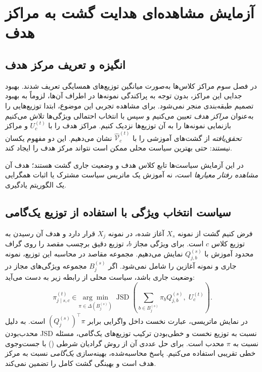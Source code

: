 \section{آزمایش مشاهده‌ای هدایت گشت به مراکز هدف}
\label{sec:ch4-center-target-observation}

\subsection{انگیزه و تعریف مرکز هدف}
\label{subsec:ch4-center-observation-motivation}
در فصل سوم مراکز کلاس‌ها به‌صورت میانگین توزیع‌های همسایگی تعریف شدند. بهبود جدایی این مراکز، بدون توجه به پراکندگی نمونه‌ها در اطراف آن‌ها، لزوماً به بهبود تصمیم طبقه‌بندی منجر نمی‌شود. برای مشاهده تجربی این موضوع، ابتدا توزیع‌هایی را به‌عنوان \emph{مراکز هدف} تعیین می‌کنیم و سپس با انتخاب احتمالی ویژگی‌ها تلاش می‌کنیم بازنمایی نمونه‌ها را به آن توزیع‌ها نزدیک کنیم. مراکز هدف را با $U_c^{(t)}$ و مراکز \emph{تحقق‌یافته} از گشت‌های آموزشی را با $\widehat{\mathcal V}_c^{(t)}$ نشان می‌دهیم. این دو مفهوم یکسان نیستند: حتی بهترین سیاست محلی ممکن است نتواند مرکز هدف را ایجاد کند.

در این آزمایش سیاست‌ها تابع کلاس هدف و وضعیت جاری گشت هستند؛ هدف آن \emph{مشاهده رفتار معیارها} است، نه آموزش یک ماتریس سیاست مشترک یا اثبات همگرایی یک الگوریتم یادگیری.

\subsection{سیاست انتخاب ویژگی با استفاده از توزیع یک‌گامی}
\label{subsec:ch4-center-observation-local-policy}
فرض کنیم گشت از نمونه $X_s$ آغاز شده، در نمونه $X_j$ قرار دارد و هدف آن رسیدن به توزیع کلاس $c$ است. برای ویژگی مجاز $b$، توزیع دقیق برچسب مقصد را روی گراف محدود آموزش با $Q_{j,b}^{(s)}$ نمایش می‌دهیم. مجموعه مقاصد در محاسبه این توزیع، نمونه جاری و نمونه آغازین را شامل نمی‌شود. اگر $B_j^{(s)}$ مجموعه ویژگی‌های مجاز در وضعیت جاری باشد، سیاست محلی از رابطه زیر به دست می‌آید:
\begin{equation}\label{eq:ch4-center-observation-policy}
\boxed{
\pi_{j\mid s,c}^{(t)}\in
\underset{\pi\in\Delta(B_j^{(s)})}{\arg\min}\;
\operatorname{JSD}\left(
\sum_{b\in B_j^{(s)}}\pi_bQ_{j,b}^{(s)},\;U_c^{(t)}\right).
}
\end{equation}
در نمایش ماتریسی، عبارت نخست داخل واگرایی برابر $(Q_j^{(s)})^\top\pi$ است. به دلیل محدب‌بودن JSD نسبت به توزیع نخست و خطی‌بودن ترکیب توزیع‌های یک‌گامی، مسئله نسبت به $\pi$ محدب است. برای حل عددی آن از روش گرادیان شرطی () با جست‌وجوی خطی تقریبی استفاده می‌کنیم. پاسخ محاسبه‌شده، بهینه‌سازی \emph{یک‌گامی} نسبت به مرکز هدف است و بهینگی گشت کامل را تضمین نمی‌کند.

